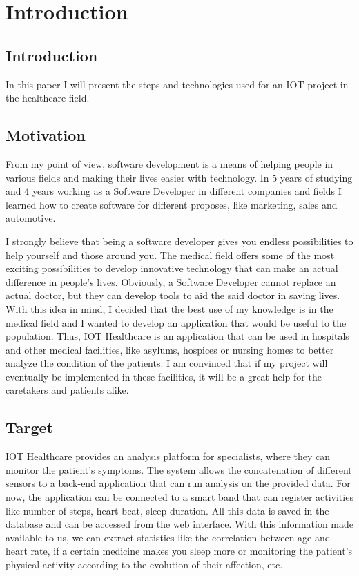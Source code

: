 
\chapter{Introduction} %

\label{Introduction} %

\section{Introduction}
In this paper I will present the steps and technologies used for an IOT project in the healthcare field.

\section{Motivation}
From my point of view, software development is a means of helping people in various fields and making their lives easier with technology.
In 5 years of studying  and 4 years working as a Software Developer in different
companies and fields I learned how to create software for different proposes, like marketing,
sales and automotive.

I strongly believe that being a software developer gives you endless possibilities to help yourself and those around you. The medical field offers some of the most exciting possibilities to develop innovative technology that can make an actual difference in people's lives. Obviously, a Software Developer cannot replace an actual doctor, but they can develop tools to aid the said doctor in saving lives. With this idea in mind, I decided that the best use of my knowledge is in the medical field and I wanted to develop an application that would be useful to the population.
Thus, IOT Healthcare is an application that can be used in hospitals and other medical facilities, like asylums, hospices or nursing homes to better analyze the condition of the patients. I am convinced that if my project will eventually be implemented in these facilities, it will be a great help for the caretakers and patients alike.



\section{Target}

IOT Healthcare provides an analysis platform for specialists, where they can monitor the patient's symptoms. The system allows the concatenation of different sensors to a back-end application that can run analysis on the provided data. For now, the application can be connected to a smart band that can register activities like number of steps, heart beat, sleep duration. All this data is saved in the database and can be accessed from the web interface. With this information made available to us, we can extract statistics like the correlation between age and heart rate, if a certain medicine makes you sleep more or monitoring the patient's physical activity according to the evolution of their affection, etc.